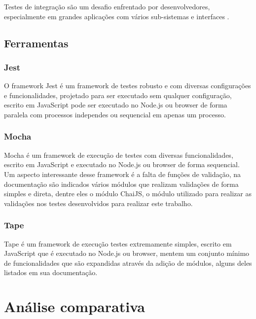 \documentclass[10pt,brazil,english]{article}
\begin{document}
Testes de integração são um desafio enfrentado por desenvolvedores, especialmente em grandes aplicações com vários sub-sistemas e interfaces \cite{tsai2001end}.

\subsection{Ferramentas}
\subsubsection{Jest}
O framework Jest é um framework de testes robusto e com diversas configurações e funcionalidades, projetado para ser executado sem qualquer configuração, escrito em JavaScript pode ser executado no Node.js ou browser de forma paralela com processos independes ou sequencial em apenas um processo.



\subsubsection{Mocha}
Mocha é um framework de execução de testes com diversas funcionalidades, escrito em JavaScript e executado no Node.js ou browser de forma sequencial. Um aspecto interessante desse framework é a falta de funções de validação, na documentação são indicados vários módulos que realizam validações de forma simples e direta, dentre eles o módulo ChaiJS, o módulo utilizado para realizar as validações nos testes desenvolvidos para realizar este trabalho.



\subsubsection{Tape}
Tape é um framework de execução testes extremamente simples, escrito em JavaScript que é executado no Node.js ou browser, mentem um conjunto mínimo de funcionalidades que são expandidas através da adição de módulos, alguns deles listados em sua documentação.



\section{Análise comparativa}
\end{document}
